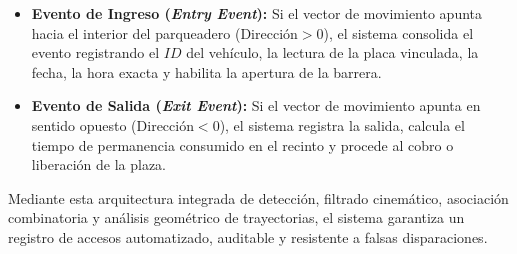 \begin{itemize}
    \item \textbf{Evento de Ingreso (\textit{Entry Event}):} Si el vector de
        movimiento apunta hacia el interior del parqueadero
        ($\text{Dirección} > 0$), el sistema consolida el evento registrando el
        $ID$ del vehículo, la lectura de la placa vinculada, la fecha, la hora
        exacta y habilita la apertura de la barrera.
    \item \textbf{Evento de Salida (\textit{Exit Event}):} Si el vector de
        movimiento apunta en sentido opuesto ($\text{Dirección} < 0$), el
        sistema registra la salida, calcula el tiempo de permanencia consumido
        en el recinto y procede al cobro o liberación de la plaza.
\end{itemize}

Mediante esta arquitectura integrada de detección, filtrado cinemático,
asociación combinatoria y análisis geométrico de trayectorias, el sistema
garantiza un registro de accesos automatizado, auditable y resistente a
falsas disparaciones.

